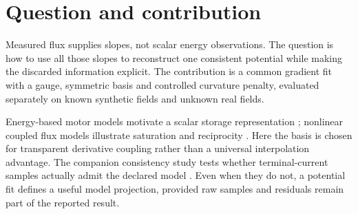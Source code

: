 \section{Question and contribution}
Measured flux supplies slopes, not scalar energy observations. The question
is how to use all those slopes to reconstruct one consistent potential while
making the discarded information explicit. The contribution is a common
gradient fit with a gauge, symmetric basis and controlled curvature penalty,
evaluated separately on known synthetic fields and unknown real fields.

Energy-based motor models motivate a scalar storage representation
\cite{jebai2014}; nonlinear coupled flux models illustrate saturation and
reciprocity \cite{sun2020}. Here the basis is chosen for transparent derivative
coupling rather than a universal interpolation advantage. The companion
consistency study tests whether terminal-current samples actually admit the
declared model \cite{companion-consistency}. Even when they do not, a potential
fit defines a useful model projection, provided raw samples and residuals
remain part of the reported result.
